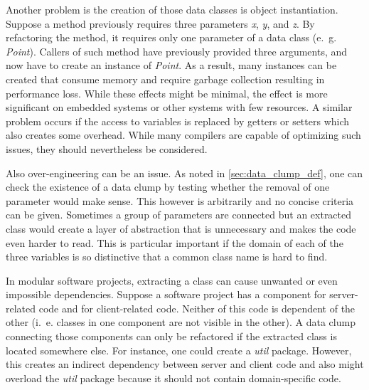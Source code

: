Another problem is the creation of those data classes is object instantiation. Suppose a method previously requires three parameters \textit{x}, \textit{y}, and \textit{z}. By refactoring the method, it requires only one parameter of a data class (e.~g. \textit{Point}). Callers of such method have previously provided three arguments, and now have to create an instance of \textit{Point}. As a result, many instances can be created that consume memory and require garbage collection resulting in performance loss. While these effects might be minimal, the effect is more significant on embedded systems or other systems with few resources. A similar problem occurs if the access to variables is replaced by getters or setters which also creates some overhead. While many compilers are capable of optimizing such issues, they should nevertheless be considered. 

Also over-engineering can be an issue. As noted in \ref{sec:data_clump_def}, one can check the existence of a data clump by testing whether the removal of one parameter would make sense. This however is arbitrarily and no concise criteria can be given. Sometimes a group of parameters are connected but an extracted class would create a layer of abstraction that is unnecessary and makes the code even harder to read. This is particular important if the domain of each of the three variables is so distinctive that a common class name is hard to find.

In modular software projects, extracting a class can cause unwanted or even impossible dependencies.  Suppose a software project has a component for server-related code and for client-related code. Neither of this code is dependent of the other (i.~e. classes in one component are not visible in the other). A data clump connecting those components can only be refactored if the extracted class is located somewhere else. For instance, one could create a \textit{util} package. However, this creates an indirect dependency between server and client code and also might overload the \textit{util} package because it should not contain domain-specific code. 

